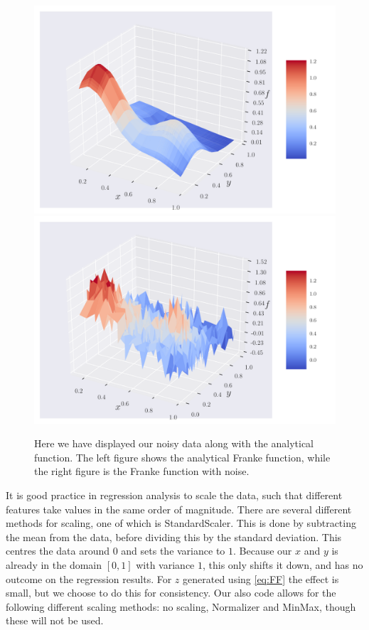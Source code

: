 \documentclass[reprint,english,notitlepage,aps,nobalancelastpage,nofootinbib]{revtex4-1}  %
\begin{document}
\begin{figure}[h]
	\includegraphics[width=\linewidth]{Frank_anal_eps_0.pdf}
	\endminipage\hfill
	\includegraphics[width=\linewidth]{Franke_rawdata_eps02.pdf}
	\endminipage
	\caption{Here we have displayed our noisy data along with the analytical function. The left figure shows the analytical Franke function, while the right figure is the Franke function with noise.}\label{fig:FF_dataset}
\end{figure}

It is good practice in regression analysis to scale the data, such that different features take values in the same order of magnitude. There are several different methods for scaling, one of which is StandardScaler. This is done by subtracting the mean from the data, before dividing this by the standard deviation. This centres the data around $0$ and sets the variance to $1$. Because our $x$ and $y$ is already in the domain $[0, 1]$ with variance $1$, this only shifts it down, and has no outcome on the regression results. For $z$ generated using \eqref{eq:FF} the effect is small, but we choose to do this for consistency. Our also code allows for the following different scaling methods: no scaling, Normalizer and MinMax, though these will not be used.
\end{document}
